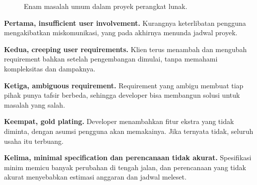 \documentclass[11pt,a4paper]{article}
\begin{document}
\begin{figure}[H]
	\centering
	\caption{Enam masalah umum dalam proyek perangkat lunak.}
	\label{fig:problems}
\end{figure}

\textbf{Pertama, insufficient user involvement.} Kurangnya keterlibatan pengguna mengakibatkan miskomunikasi, yang pada akhirnya menunda jadwal proyek.

\textbf{Kedua, creeping user requirements.} Klien terus menambah dan mengubah requirement bahkan setelah pengembangan dimulai, tanpa memahami kompleksitas dan dampaknya.

\textbf{Ketiga, ambiguous requirement.} Requirement yang ambigu membuat tiap pihak punya tafsir berbeda, sehingga developer bisa membangun solusi untuk masalah yang salah.

\textbf{Keempat, gold plating.} Developer menambahkan fitur ekstra yang tidak diminta, dengan asumsi pengguna akan memakainya. Jika ternyata tidak, seluruh usaha itu terbuang.

\textbf{Kelima, minimal specification dan perencanaan tidak akurat.} Spesifikasi minim memicu banyak perubahan di tengah jalan, dan perencanaan yang tidak akurat menyebabkan estimasi anggaran dan jadwal meleset.
\end{document}
